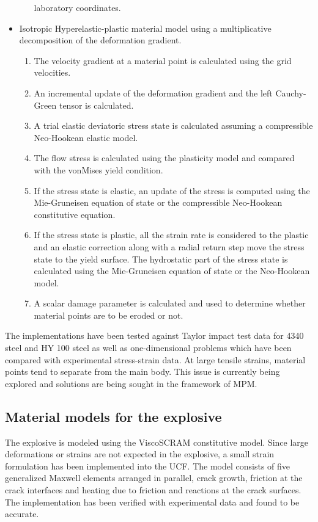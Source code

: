 \documentclass[10pt]{article}
\begin{document}
\begin{itemize}
\begin{enumerate}
              laboratory coordinates.
     \end{enumerate}
   \item Isotropic Hyperelastic-plastic material model using a 
         multiplicative decomposition of the deformation gradient.
     \begin{enumerate}
        \item The velocity gradient at a material point
              is calculated using the grid velocities.
        \item An incremental update of the deformation gradient and
              the left Cauchy-Green tensor is calculated.
        \item A trial elastic deviatoric stress state is calculated
              assuming a compressible Neo-Hookean elastic model.
        \item The flow stress is calculated using the plasticity
              model and compared with the vonMises yield condition.
        \item If the stress state is elastic, an update of the 
              stress is computed using the Mie-Gruneisen equation
              of state or the compressible Neo-Hookean constitutive
              equation.
        \item If the stress state is plastic, all the strain rate 
              is considered to the plastic and an elastic correction
              along with a radial return step move the stress state
              to the yield surface.  The hydrostatic part of the 
              stress state is calculated using the Mie-Gruneisen
              equation of state or the Neo-Hookean model.
        \item A scalar damage parameter is calculated and used
              to determine whether material points are to be eroded
              or not.
     \end{enumerate}
\end{itemize}

The implementations have been tested against Taylor impact test data
for 4340 steel and HY 100 steel as well as one-dimensional problems
which have been compared with experimental stress-strain data.  At 
large tensile strains, material points tend to separate from the 
main body.  This issue is currently being explored and solutions are
being sought in the framework of MPM.

\subsection{Material models for the explosive}
The explosive is modeled using the ViscoSCRAM constitutive 
model.  Since large deformations or strains are not expected in 
the explosive, a small strain formulation has been implemented into 
the UCF.  The model consists of five generalized Maxwell elements
arranged in parallel, crack growth, friction at the crack 
interfaces and heating due to friction and reactions at the 
crack surfaces.  The implementation has been verified with 
experimental data and found to be accurate.
\end{document}
